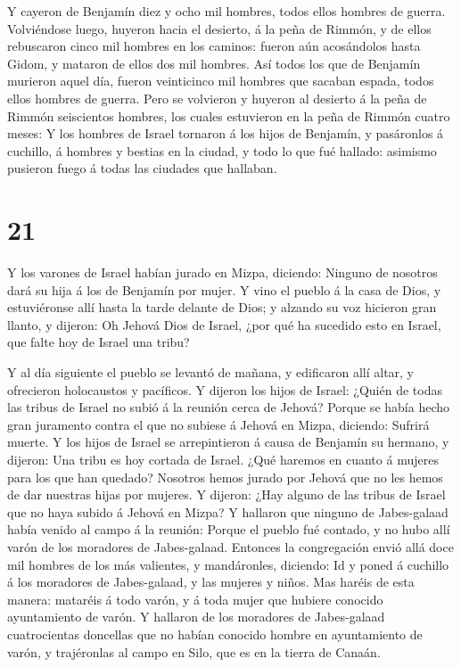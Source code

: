  Y cayeron de Benjamín diez y ocho mil hombres, todos ellos
hombres de guerra.  Volviéndose luego, huyeron hacia el
desierto, á la peña de Rimmón, y de ellos rebuscaron cinco mil hombres
en los caminos: fueron aún acosándolos hasta Gidom, y mataron de ellos
dos mil hombres.  Así todos los que de Benjamín murieron
aquel día, fueron veinticinco mil hombres que sacaban espada, todos
ellos hombres de guerra.  Pero se volvieron y huyeron al
desierto á la peña de Rimmón seiscientos hombres, los cuales estuvieron
en la peña de Rimmón cuatro meses:  Y los hombres de Israel
tornaron á los hijos de Benjamín, y pasáronlos á cuchillo, á hombres y
bestias en la ciudad, y todo lo que fué hallado: asimismo pusieron fuego
á todas las ciudades que hallaban.

\hypertarget{section-20}{%
\section{21}\label{section-20}}

 Y los varones de Israel habían jurado en Mizpa, diciendo:
Ninguno de nosotros dará su hija á los de Benjamín por mujer.
 Y vino el pueblo á la casa de Dios, y estuviéronse allí
hasta la tarde delante de Dios; y alzando su voz hicieron gran llanto, y
dijeron:  Oh Jehová Dios de Israel, ¿por qué ha sucedido
esto en Israel, que falte hoy de Israel una tribu?

 Y al día siguiente el pueblo se levantó de mañana, y
edificaron allí altar, y ofrecieron holocaustos y pacíficos.
 Y dijeron los hijos de Israel: ¿Quién de todas las tribus
de Israel no subió á la reunión cerca de Jehová? Porque se había hecho
gran juramento contra el que no subiese á Jehová en Mizpa, diciendo:
Sufrirá muerte.  Y los hijos de Israel se arrepintieron á
causa de Benjamín su hermano, y dijeron: Una tribu es hoy cortada de
Israel.  ¿Qué haremos en cuanto á mujeres para los que han
quedado? Nosotros hemos jurado por Jehová que no les hemos de dar
nuestras hijas por mujeres.  Y dijeron: ¿Hay alguno de las
tribus de Israel que no haya subido á Jehová en Mizpa? Y hallaron que
ninguno de Jabes-galaad había venido al campo á la reunión: 
Porque el pueblo fué contado, y no hubo allí varón de los moradores de
Jabes-galaad.  Entonces la congregación envió allá doce mil
hombres de los más valientes, y mandáronles, diciendo: Id y poned á
cuchillo á los moradores de Jabes-galaad, y las mujeres y niños.
 Mas haréis de esta manera: mataréis á todo varón, y á toda
mujer que hubiere conocido ayuntamiento de varón.  Y
hallaron de los moradores de Jabes-galaad cuatrocientas doncellas que no
habían conocido hombre en ayuntamiento de varón, y trajéronlas al campo
en Silo, que es en la tierra de Canaán.

